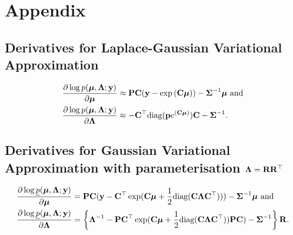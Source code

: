 			\section{Appendix}
			\subsection{Derivatives for Laplace-Gaussian Variational Approximation}
			\label{sec:appendix_derivatives_laplace}
			\begin{align*}
				\frac{\partial \log p({\boldsymbol \mu}, {\boldsymbol \Lambda}; {\bf y})}{\partial {\boldsymbol\mu}}     & \approx {\bf P} {\bf C} ({\bf y} - \exp{({\bf C}{\boldsymbol\mu})}) - {\boldsymbol \Sigma}^{-1} {\boldsymbol \mu} \text{ and} \\
				\frac{\partial \log p({\boldsymbol \mu}, {\boldsymbol \Lambda}; {\bf y})}{\partial {\boldsymbol\Lambda}} & \approx - {\bf C}^\top \text{diag}({\bf p} e^{({\bf C} {\boldsymbol \mu})}) {\bf C} - {\boldsymbol \Sigma}^{-1}.   
			\end{align*}
					
			\subsection{Derivatives for Gaussian Variational Approximation with parameterisation ${\boldsymbol \Lambda} = {\bf R} {\bf R}^\top$}
			\label{sec:appendix_derivatives_gva}
			\begin{align*}
				\frac{\partial \log \underline{p}({\boldsymbol \mu}, {\boldsymbol \Lambda}; {\bf y})}{\partial {\boldsymbol\mu}}     & = {\bf P} {\bf C} ({\bf y} - {\bf C}^\top \exp({\bf C} {\boldsymbol \mu} + \frac{1}{2} \text{diag}{({\bf C}{\boldsymbol\Lambda}{\bf C}^\top)})) - {\boldsymbol \Sigma}^{-1} {\boldsymbol \mu} \text{ and}                \\
				\frac{\partial \log \underline{p}({\boldsymbol \mu}, {\boldsymbol \Lambda}; {\bf y})}{\partial {\boldsymbol\Lambda}} & = \left \{{\boldsymbol \Lambda}^{-1} - {\bf P} {\bf C}^\top \exp({\bf C} {\boldsymbol \mu} + \frac{1}{2} \text{diag}({\bf C} {\boldsymbol \Lambda} {\bf C}^\top)) {\bf P} {\bf C}) - {\boldsymbol \Sigma}^{-1} \right \} {\bf R}. 
			\end{align*}

